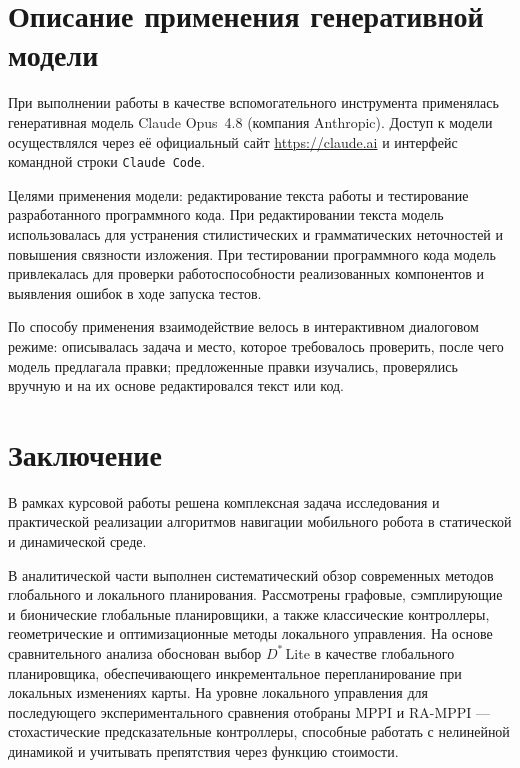 \documentclass[a4paper,12pt]{extarticle}
\begin{document}
    \section*{Описание применения генеративной модели}

    При выполнении работы в качестве вспомогательного инструмента
    применялась генеративная модель Claude Opus~4.8 (компания Anthropic).
    Доступ к модели осуществлялся через её официальный сайт
    \url{https://claude.ai} и интерфейс командной строки \texttt{Claude Code}.

    Целями применения модели: редактирование текста работы
    и тестирование разработанного программного кода. 
    При редактировании текста модель использовалась для устранения
    стилистических и грамматических неточностей и повышения связности изложения. 
    При тестировании программного кода модель привлекалась для проверки
    работоспособности реализованных компонентов и выявления ошибок в ходе
    запуска тестов.

    По способу применения взаимодействие велось в интерактивном диалоговом
    режиме: описывалась задача и место, которое требовалось
    проверить, после чего модель предлагала правки; предложенные правки
    изучались, проверялись вручную и на их основе редактировался текст или код.

    \newpage

    \section*{Заключение}

    В рамках курсовой работы решена комплексная задача исследования и
    практической реализации алгоритмов навигации мобильного робота
    в статической и динамической среде.

    В аналитической части выполнен систематический обзор современных методов глобального и локального планирования. Рассмотрены графовые, сэмплирующие и бионические глобальные планировщики, а также классические контроллеры, геометрические и оптимизационные методы локального управления. На основе сравнительного анализа обоснован выбор $D^*$\,Lite в качестве глобального планировщика, обеспечивающего инкрементальное перепланирование при локальных изменениях карты. На уровне локального управления для последующего экспериментального сравнения отобраны MPPI и RA-MPPI --- стохастические предсказательные контроллеры, способные работать с нелинейной динамикой и учитывать препятствия через функцию стоимости.
\end{document}
